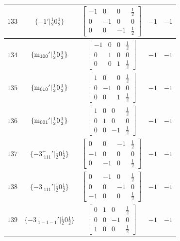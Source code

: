 \documentclass[fleqn,8pt]{jsarticle}
\begin{document}
\begin{longtable}{ccccc}
$ 133 $ & $ \{-1{}'|\frac{1}{2} 0 \frac{1}{2}\} $ & $ \begin{bmatrix} -1 & 0 & 0 & \frac{1}{2} \\ 0 & -1 & 0 & 0 \\ 0 & 0 & -1 & \frac{1}{2} \end{bmatrix} $ & $ -1 $ & $ -1 $ \\ \hline
$ 134 $ & $ \{{\rm m}_{100}{}'|\frac{1}{2} 0 \frac{1}{2}\} $ & $ \begin{bmatrix} -1 & 0 & 0 & \frac{1}{2} \\ 0 & 1 & 0 & 0 \\ 0 & 0 & 1 & \frac{1}{2} \end{bmatrix} $ & $ -1 $ & $ -1 $ \\ \hline
$ 135 $ & $ \{{\rm m}_{010}{}'|\frac{1}{2} 0 \frac{1}{2}\} $ & $ \begin{bmatrix} 1 & 0 & 0 & \frac{1}{2} \\ 0 & -1 & 0 & 0 \\ 0 & 0 & 1 & \frac{1}{2} \end{bmatrix} $ & $ -1 $ & $ -1 $ \\ \hline
$ 136 $ & $ \{{\rm m}_{001}{}'|\frac{1}{2} 0 \frac{1}{2}\} $ & $ \begin{bmatrix} 1 & 0 & 0 & \frac{1}{2} \\ 0 & 1 & 0 & 0 \\ 0 & 0 & -1 & \frac{1}{2} \end{bmatrix} $ & $ -1 $ & $ -1 $ \\ \hline
$ 137 $ & $ \{-3^{+}_{\,\,111}{}'|\frac{1}{2} 0 \frac{1}{2}\} $ & $ \begin{bmatrix} 0 & 0 & -1 & \frac{1}{2} \\ -1 & 0 & 0 & 0 \\ 0 & -1 & 0 & \frac{1}{2} \end{bmatrix} $ & $ -1 $ & $ -1 $ \\ \hline
$ 138 $ & $ \{-3^{-}_{\,\,111}{}'|\frac{1}{2} 0 \frac{1}{2}\} $ & $ \begin{bmatrix} 0 & -1 & 0 & \frac{1}{2} \\ 0 & 0 & -1 & 0 \\ -1 & 0 & 0 & \frac{1}{2} \end{bmatrix} $ & $ -1 $ & $ -1 $ \\ \hline
$ 139 $ & $ \{-3^{-}_{\,\,1-1-1}{}'|\frac{1}{2} 0 \frac{1}{2}\} $ & $ \begin{bmatrix} 0 & 1 & 0 & \frac{1}{2} \\ 0 & 0 & -1 & 0 \\ 1 & 0 & 0 & \frac{1}{2} \end{bmatrix} $ & $ -1 $ & $ -1 $ \\ \hline

\end{longtable}
\end{document}
